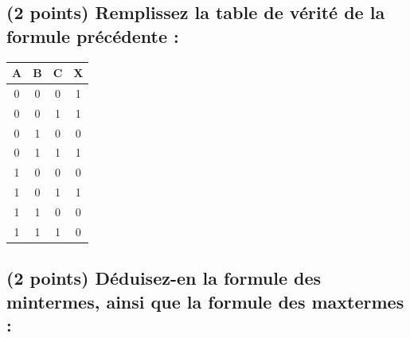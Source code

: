 \documentclass[11pt,a4paper]{article}
\begin{document}


\begin{table}[!ht]
  \centering
  \begin{minipage}{0.50\textwidth}
    \centering

\subsection{(2 points) Remplissez la table de vérité de la formule précédente : }

\bigskip

\begin{center}
\begin{tabular}{|c|c|c||c|}
\hline
\cellcolor{black!15} \textbf{A} & \cellcolor{black!15} \textbf{B} & \cellcolor{black!15} \textbf{C}  &  \cellcolor{black!15} \textbf{X} \\
\hline
\hline
0 & 0 & 0  &  \cellcolor{black!15} 1 \\ \hline
0 & 0 & 1  &  \cellcolor{black!15} 1 \\ \hline
0 & 1 & 0  &  \cellcolor{black!15} 0 \\ \hline
0 & 1 & 1  &  \cellcolor{black!15} 1 \\ \hline
1 & 0 & 0  &  \cellcolor{black!15} 0 \\ \hline
1 & 0 & 1  &  \cellcolor{black!15} 1 \\ \hline
1 & 1 & 0  &  \cellcolor{black!15} 0 \\ \hline
1 & 1 & 1  &  \cellcolor{black!15} 0 \\ \hline
\end{tabular}
\end{center}

\vspace*{1.0cm}


\vspace*{1.0cm}



  \end{minipage}
  \hfillx
  \begin{minipage}{0.50\textwidth}


\subsection{(2 points) Déduisez-en la formule des mintermes, ainsi que la formule des maxtermes : }


\end{minipage}
\end{table}
\end{document}
